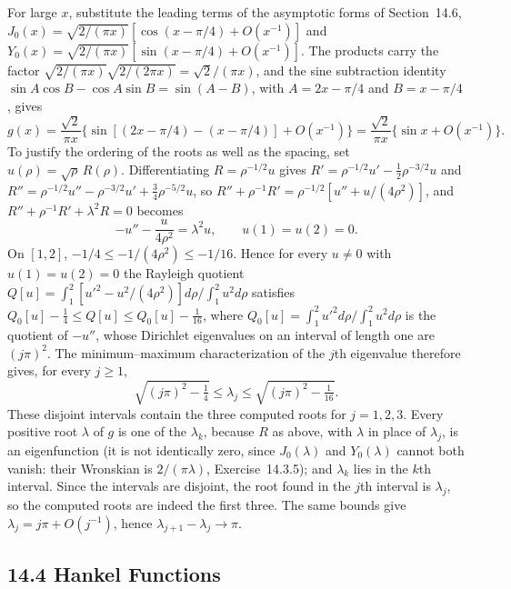For large $x$, substitute the leading terms of the asymptotic forms
of Section~14.6,
$J_0(x)=\sqrt{2/(\pi x)}[\cos(x-\pi/4)+O(x^{-1})]$ and
$Y_0(x)=\sqrt{2/(\pi x)}[\sin(x-\pi/4)+O(x^{-1})]$.
The products carry the factor
$\sqrt{2/(\pi x)}\sqrt{2/(2\pi x)}=\sqrt2/(\pi x)$, and the sine
subtraction identity
$\sin A\cos B-\cos A\sin B=\sin(A-B)$, with $A=2x-\pi/4$ and
$B=x-\pi/4$, gives
\[
g(x)=\frac{\sqrt2}{\pi x}
\{\sin[(2x-\pi/4)-(x-\pi/4)]+O(x^{-1})\}
=\frac{\sqrt2}{\pi x}\{\sin x+O(x^{-1})\}.
\]
To justify the ordering of the roots as well as the spacing, set
$u(\rho)=\sqrt{\rho}\,R(\rho)$. Differentiating $R=\rho^{-1/2}u$
gives $R'=\rho^{-1/2}u'-\frac12\rho^{-3/2}u$ and
$R''=\rho^{-1/2}u''-\rho^{-3/2}u'+\frac34\rho^{-5/2}u$, so
$R''+\rho^{-1}R'=\rho^{-1/2}[u''+u/(4\rho^2)]$, and
$R''+\rho^{-1}R'+\lambda^2R=0$ becomes
\[
-u''-\frac{u}{4\rho^2}=\lambda^2u,\qquad u(1)=u(2)=0.
\]
On $[1,2]$, $-1/4\le-1/(4\rho^2)\le-1/16$. Hence for every
$u\ne0$ with $u(1)=u(2)=0$ the Rayleigh quotient
$Q[u]=\int_1^2[u'^2-u^2/(4\rho^2)]d\rho\big/\!\int_1^2u^2d\rho$
satisfies $Q_0[u]-\frac14\le Q[u]\le Q_0[u]-\frac1{16}$, where
$Q_0[u]=\int_1^2u'^2d\rho/\!\int_1^2u^2d\rho$ is the quotient of
$-u''$, whose Dirichlet eigenvalues on an interval of length one are
$(j\pi)^2$. The minimum--maximum characterization of the $j$th
eigenvalue therefore gives, for every $j\ge1$,
\[
\sqrt{(j\pi)^2-\tfrac14}\le\lambda_j
\le\sqrt{(j\pi)^2-\tfrac1{16}}.
\]
These disjoint intervals contain the three computed roots for
$j=1,2,3$. Every positive root $\lambda$ of $g$ is one of the
$\lambda_k$, because $R$ as above, with $\lambda$ in place of
$\lambda_j$, is an eigenfunction (it is not identically zero, since
$J_0(\lambda)$ and $Y_0(\lambda)$ cannot both vanish: their Wronskian
is $2/(\pi\lambda)$, Exercise~14.3.5); and $\lambda_k$ lies in the
$k$th interval. Since the intervals are disjoint, the root found in
the $j$th interval is $\lambda_j$, so the computed roots are indeed
the first three. The same bounds
give $\lambda_j=j\pi+O(j^{-1})$, hence
$\lambda_{j+1}-\lambda_j\to\pi$.

\subsection*{14.4 Hankel Functions}

